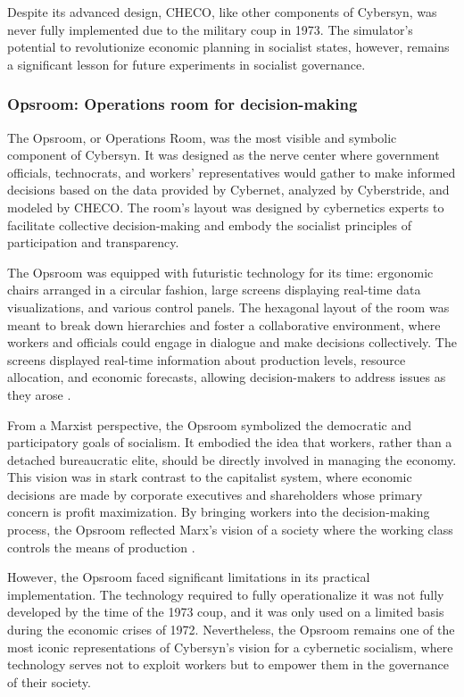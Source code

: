 \begin{refsection}
Despite its advanced design, CHECO, like other components of Cybersyn, was never fully implemented due to the military coup in 1973. The simulator's potential to revolutionize economic planning in socialist states, however, remains a significant lesson for future experiments in socialist governance.

\subsubsection{Opsroom: Operations room for decision-making}

The Opsroom, or Operations Room, was the most visible and symbolic component of Cybersyn. It was designed as the nerve center where government officials, technocrats, and workers' representatives would gather to make informed decisions based on the data provided by Cybernet, analyzed by Cyberstride, and modeled by CHECO. The room’s layout was designed by cybernetics experts to facilitate collective decision-making and embody the socialist principles of participation and transparency.

The Opsroom was equipped with futuristic technology for its time: ergonomic chairs arranged in a circular fashion, large screens displaying real-time data visualizations, and various control panels. The hexagonal layout of the room was meant to break down hierarchies and foster a collaborative environment, where workers and officials could engage in dialogue and make decisions collectively. The screens displayed real-time information about production levels, resource allocation, and economic forecasts, allowing decision-makers to address issues as they arose \cite[pp.~175-178]{medina2014}.

From a Marxist perspective, the Opsroom symbolized the democratic and participatory goals of socialism. It embodied the idea that workers, rather than a detached bureaucratic elite, should be directly involved in managing the economy. This vision was in stark contrast to the capitalist system, where economic decisions are made by corporate executives and shareholders whose primary concern is profit maximization. By bringing workers into the decision-making process, the Opsroom reflected Marx's vision of a society where the working class controls the means of production \cite[pp.~123-127]{lenin1917}.

However, the Opsroom faced significant limitations in its practical implementation. The technology required to fully operationalize it was not fully developed by the time of the 1973 coup, and it was only used on a limited basis during the economic crises of 1972. Nevertheless, the Opsroom remains one of the most iconic representations of Cybersyn’s vision for a cybernetic socialism, where technology serves not to exploit workers but to empower them in the governance of their society.


\end{refsection}
